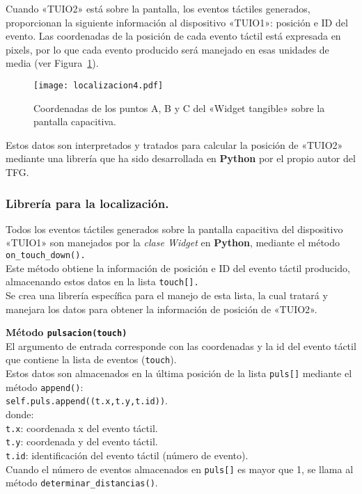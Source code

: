 Cuando «TUIO2» está sobre la pantalla, los eventos táctiles generados, proporcionan la siguiente información al dispositivo «TUIO1»: posición e ID del evento. Las coordenadas de la posición de cada evento táctil está expresada en pixels, por lo que cada evento producido será manejado en esas unidades de media (ver Figura~\ref{fig:Localizacion4}).\\
\begin{figure}[!h]
\begin{center}
\texttt{[image: localizacion4.pdf]}
\caption{Coordenadas de los puntos A, B y C del «Widget tangible» sobre la pantalla capacitiva. }
\label{fig:Localizacion4}
\end{center}
\end{figure}
Estos datos son interpretados y tratados para calcular la posición de «TUIO2» mediante una librería que ha sido desarrollada en \textbf{Python} por el propio autor del TFG.

\subsubsection{Librería para la localización.}

Todos los eventos táctiles generados sobre la pantalla capacitiva del dispositivo «TUIO1» son manejados por la \textit{clase Widget} en \textbf{Python}, mediante el método \texttt{on\_touch\_down().}\\
Este método obtiene la información de posición e ID del evento táctil producido, almacenando estos datos en la lista \texttt{touch[].}\\
Se crea una librería específica para el manejo de esta lista, la cual tratará y manejara los datos para obtener la información de posición de «TUIO2».

\textbf{Método \texttt{pulsacion(touch)}}\\
El argumento de entrada corresponde con las coordenadas y la id del evento táctil que contiene la lista de eventos (\texttt{touch}).\\
Estos datos son almacenados en la última posición de la lista \texttt{puls[]} mediante el método \texttt{append()}:\\
\texttt{self.puls.append((t.x,t.y,t.id))}.\\
donde: \\
\texttt{t.x}: coordenada x del evento táctil.\\
\texttt{t.y}: coordenada y del evento táctil.\\
\texttt{t.id}: identificación del evento táctil (número de evento).\\
Cuando el número de eventos almacenados en \texttt{puls[]} 
es mayor que 1, se llama al método \texttt{determinar\_distancias()}.

